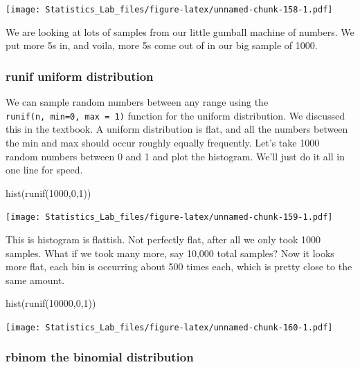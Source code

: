\documentclass[
]{book}
\newenvironment{Shaded}{\begin{snugshade}}{\end{snugshade}}
\newcommand{\DecValTok}[1]{\textcolor[rgb]{0.00,0.00,0.81}{#1}}
\newcommand{\FunctionTok}[1]{\textcolor[rgb]{0.00,0.00,0.00}{#1}}
\newcommand{\NormalTok}[1]{#1}
\begin{document}
\texttt{[image: Statistics\_Lab\_files/figure-latex/unnamed-chunk-158-1.pdf]}

We are looking at lots of samples from our little gumball machine of numbers. We put more 5s in, and voila, more 5s come out of in our big sample of 1000.

\hypertarget{runif-uniform-distribution}{%
\subsubsection{runif uniform distribution}\label{runif-uniform-distribution}}

We can sample random numbers between any range using the \texttt{runif(n,\ min=0,\ max\ =\ 1)} function for the uniform distribution. We discussed this in the textbook. A uniform distribution is flat, and all the numbers between the min and max should occur roughly equally frequently. Let's take 1000 random numbers between 0 and 1 and plot the histogram. We'll just do it all in one line for speed.

\begin{Shaded}
\begin{Highlighting}[]
\FunctionTok{hist}\NormalTok{(}\FunctionTok{runif}\NormalTok{(}\DecValTok{1000}\NormalTok{,}\DecValTok{0}\NormalTok{,}\DecValTok{1}\NormalTok{))}
\end{Highlighting}
\end{Shaded}

\texttt{[image: Statistics\_Lab\_files/figure-latex/unnamed-chunk-159-1.pdf]}

This is histogram is flattish. Not perfectly flat, after all we only took 1000 samples. What if we took many more, say 10,000 total samples? Now it looks more flat, each bin is occurring about 500 times each, which is pretty close to the same amount.

\begin{Shaded}
\begin{Highlighting}[]
\FunctionTok{hist}\NormalTok{(}\FunctionTok{runif}\NormalTok{(}\DecValTok{10000}\NormalTok{,}\DecValTok{0}\NormalTok{,}\DecValTok{1}\NormalTok{))}
\end{Highlighting}
\end{Shaded}

\texttt{[image: Statistics\_Lab\_files/figure-latex/unnamed-chunk-160-1.pdf]}

\hypertarget{rbinom-the-binomial-distribution}{%
\subsubsection{rbinom the binomial distribution}\label{rbinom-the-binomial-distribution}}
\end{document}
